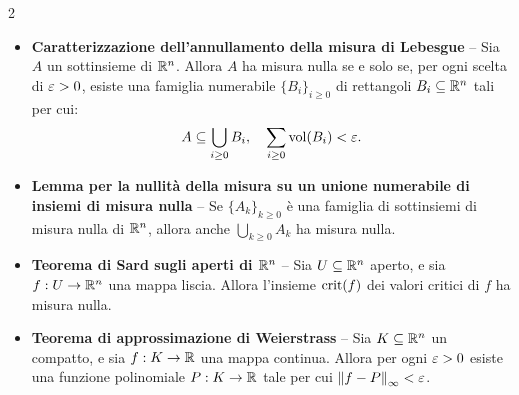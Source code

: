 \begin{multicols*}{2}
\begin{itemize}
            \item \textbf{Caratterizzazione dell'annullamento della misura di Lebesgue} -- Sia $A$ un sottinsieme di $\mathbb{R}^n$. Allora
                  $A$ ha misura nulla se e solo se, per ogni scelta di $\varepsilon > 0$, esiste una famiglia numerabile $\{B_i\}_{i \geq 0}$
                  di rettangoli $B_i \subseteq \mathbb{R}^n$ tali per cui:
                  \[ A \subseteq \bigcup_{i \geq 0} B_i, \quad \sum_{i \geq 0} \operatorname{vol}(B_i) < \varepsilon. \]

            \item \textbf{Lemma per la nullità della misura su un unione numerabile di insiemi di misura nulla} -- Se $\{A_k\}_{k \geq 0}$
                  è una famiglia di sottinsiemi di misura nulla di $\mathbb{R}^n$, allora anche $\bigcup_{k \geq 0} A_k$ ha misura nulla.

            \item \textbf{Teorema di Sard sugli aperti di $\mathbb{R}^n$} -- Sia $U \subseteq \mathbb{R}^n$ aperto, e sia $f : U \to \mathbb{R}^n$ una mappa
                  liscia. Allora l'insieme $\operatorname{crit}(f)$ dei valori critici di $f$ ha misura nulla.

            \item \textbf{Teorema di approssimazione di Weierstrass} -- Sia $K \subseteq \mathbb{R}^n$ un compatto, e sia $f : K \to \mathbb{R}$ una mappa
                  continua. Allora per ogni $\varepsilon > 0$ esiste una funzione polinomiale $P : K \to \mathbb{R}$ tale per cui $\left\lVert f-P \right\rVert_\infty < \varepsilon$.
      \end{itemize}

\end{multicols*}